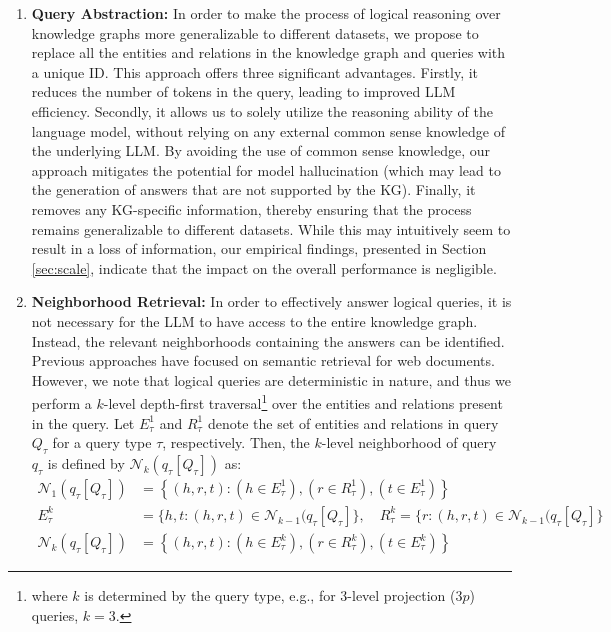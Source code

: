 \documentclass{article} %
\begin{document}
\begin{enumerate}[noitemsep,leftmargin=*]
    \item \textbf{Query Abstraction:} In order to make the process of logical reasoning over knowledge graphs more generalizable to different datasets, we propose to replace all the entities and relations in the knowledge graph and queries with a unique ID. This approach offers three significant advantages. Firstly, it reduces the number of tokens in the query, leading to improved LLM efficiency. Secondly, {it allows us to solely utilize the reasoning ability of the language model, without relying on any external common sense knowledge of the underlying LLM. By avoiding the use of common sense knowledge, our approach mitigates the potential for model hallucination (which may lead to the generation of answers that are not supported by the KG).} Finally, it removes any KG-specific information, thereby ensuring that the process remains generalizable to different datasets.   While this may intuitively seem to result in a loss of information, our empirical findings, presented in Section \ref{sec:scale}, indicate that the impact on the overall performance is negligible. \vspace{0.05in}
    
    \item \textbf{Neighborhood Retrieval:} In order to effectively answer logical queries, it is not necessary for the LLM to have access to the entire knowledge graph. Instead, the relevant neighborhoods containing the answers can be identified. Previous approaches \citep{guu2020realm,chen2022decoupling} have focused on semantic retrieval for web documents. However, we note that logical queries are deterministic in nature, and thus we perform a $k$-level depth-first traversal\footnote{where $k$ is determined by the query type, e.g., for 3-level projection ($3p$) queries, $k=3$.} over the entities and relations present in the query. Let $E^1_\tau$ and $R^1_\tau$ denote the set of entities and relations in query $Q_\tau$ for a query type $\tau$, respectively. Then, the $k$-level neighborhood of query $q_\tau$ is defined by $\mathcal{N}_
    k(q_\tau[Q_\tau])$ as:
    \begin{align}
        \mathcal{N}_1(q_\tau[Q_\tau]) &= \left\{(h,r,t): \left(h\in E^1_\tau\right), \left( r \in R^1_\tau\right), \left(t \in E^1_\tau\right)\right\}\\
        E^k_\tau &=\{h, t: (h,r,t) \in \mathcal{N}_{k-1}(q_\tau[Q_\tau]\},\quad
        R^k_\tau =\{r: (h,r,t) \in \mathcal{N}_{k-1}(q_\tau[Q_\tau]\}\\
        \mathcal{N}_k(q_\tau[Q_\tau]) &= \left\{(h,r,t): \left(h\in E^k_\tau\right), \left( r \in R^k_\tau\right), \left(t \in E^k_\tau\right)\right\}
        \label{eq:neighborhood}
    \end{align}
\end{enumerate}
\end{document}

